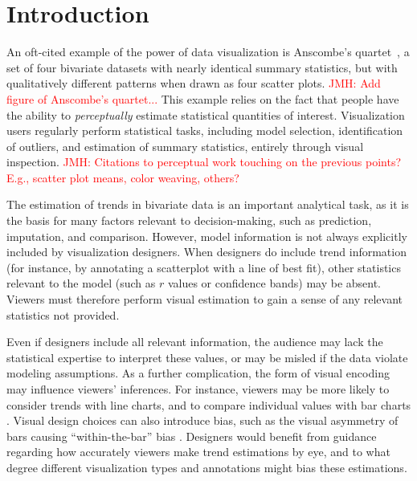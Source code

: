 \documentclass{sigchi}
\newcommand{\jeff}[1]{\textcolor{red}{JMH: #1}}
\begin{document}


\section{Introduction}


An oft-cited example of the power of data visualization is Anscombe's quartet~\cite{anscombe1973graphs}, a set of four bivariate datasets with nearly identical summary statistics, but with qualitatively different patterns when drawn as four scatter plots. \jeff{Add figure of Anscombe's quartet...} This example relies on the fact that people have the ability to \emph{perceptually} estimate statistical quantities of interest. Visualization users regularly perform statistical tasks, including model selection, identification of outliers, and estimation of summary statistics, entirely through visual inspection. \jeff{Citations to perceptual work touching on the previous points? E.g., scatter plot means, color weaving, others?}

The estimation of trends in bivariate data is an important analytical task, as it is the basis for many factors relevant to decision-making, such as prediction, imputation, and comparison. However, model information is not always explicitly included by visualization designers. When designers do include trend information (for instance, by annotating a scatterplot with a line of best fit), other statistics relevant to the model (such as $r$ values or confidence bands) may be absent. Viewers must therefore perform visual estimation to gain a sense of any relevant statistics not provided.

Even if designers include all relevant information, the audience may lack the statistical expertise to interpret these values, or may be misled if the data violate modeling assumptions. As a further complication, the form of visual encoding may influence viewers' inferences. For instance, viewers may be more likely to consider trends with line charts, and to compare individual values with bar charts \cite{zacks1999bars}. Visual design choices can also introduce bias, such as the visual asymmetry of bars causing ``within-the-bar'' bias \cite{newman2012bar}. Designers would benefit from guidance regarding how accurately viewers make trend estimations by eye, and to what degree different visualization types and annotations might bias these estimations.
\end{document}
